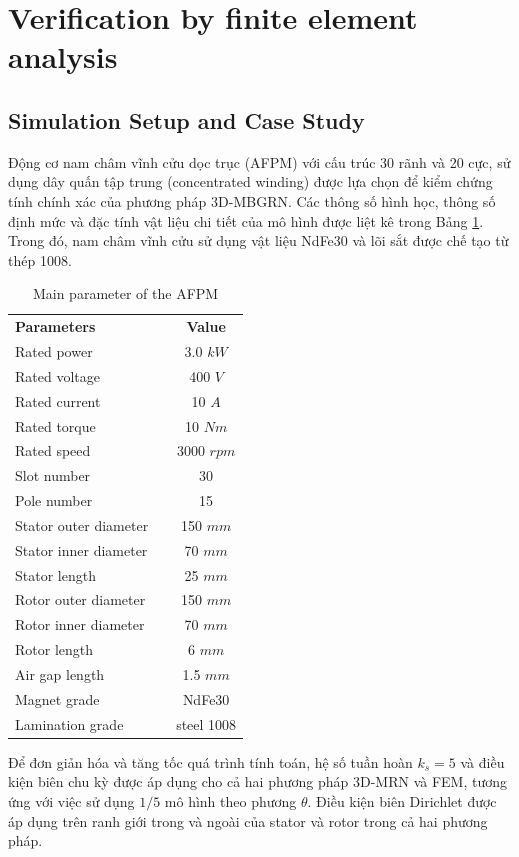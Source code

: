 \section{Verification by finite element analysis}
\subsection{Simulation Setup and Case Study}

Động cơ nam châm vĩnh cửu dọc trục (AFPM) với cấu trúc 30 rãnh và 20 cực, sử dụng dây quấn tập trung (concentrated winding) được lựa chọn để kiểm chứng tính chính xác của phương pháp 3D-MBGRN. Các thông số hình học, thông số định mức và đặc tính vật liệu chi tiết của mô hình được liệt kê trong Bảng \ref{afpm_par}. Trong đó, nam châm vĩnh cửu sử dụng vật liệu NdFe30 và lõi sắt được chế tạo từ thép 1008.

\begin{table}[ht]
\centering
\caption{Main parameter of the AFPM}
\begin{tabular}{lcc}
\hline
\textbf{Parameters} && \textbf{Value}\\
Rated power         && 3.0 $kW$      \\
Rated voltage       && 400 $V$       \\ 
Rated current       && 10 $A$        \\ 
Rated torque        && 10 $Nm$        \\
Rated speed         && 3000 $rpm$     \\
Slot number         && 30  \\ 
Pole number         && 15 \\ 
Stator outer diameter && 150 $mm$ \\ 
Stator inner diameter && 70 $mm$ \\ 
Stator length       && 25 $mm$ \\
Rotor outer diameter && 150 $mm$ \\ 
Rotor inner diameter && 70 $mm$ \\ 
Rotor length && 6 $mm$ \\ 
Air gap length         && 1.5 $mm$ \\ 
Magnet grade           && NdFe30 \\
Lamination grade       && steel 1008 \\
\hline
\end{tabular}
\label{afpm_par}
\end{table}

Để đơn giản hóa và tăng tốc quá trình tính toán, hệ số tuần hoàn $k_s = 5$ và điều kiện biên chu kỳ được áp dụng cho cả hai phương pháp 3D-MRN và FEM, tương ứng với việc sử dụng $1/5$ mô hình theo phương $\theta$. Điều kiện biên Dirichlet được áp dụng trên ranh giới trong và ngoài của stator và rotor trong cả hai phương pháp.

